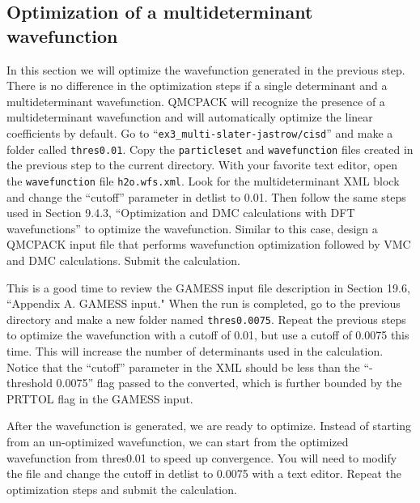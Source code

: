 \subsection{Optimization of a multideterminant wavefunction}

In this section we will optimize the wavefunction generated in the previous step. There
is no difference in the optimization steps if a single determinant and a multideterminant wavefunction.
QMCPACK will recognize the presence of a multideterminant wavefunction and will automatically 
optimize the linear coefficients by default. Go to ``\texttt{ex3\_multi-slater-jastrow/cisd}'' and make a folder called 
\texttt{thres0.01}. Copy the \texttt{particleset} and \texttt{wavefunction} files created in the previous step to the current 
directory. With your favorite text editor, open the \texttt{wavefunction} file \texttt{h2o.wfs.xml}. Look for 
the multideterminant XML block and change the ``cutoff'' parameter in detlist to 0.01. Then follow 
the same steps used in Section 9.4.3, ``Optimization and DMC calculations with DFT wavefunctions''
to optimize the wavefunction. Similar to this case, design a QMCPACK input file that performs
wavefunction optimization followed by VMC and DMC calculations. Submit the calculation.

This is a good time to review the GAMESS input file description in Section 19.6, ``Appendix A. GAMESS input."
When the run is completed, go to the previous directory and make a new folder named
\texttt{thres0.0075}. Repeat the previous steps to optimize the wavefunction with a cutoff of 0.01, but use a cutoff of 0.0075 this time. This will increase the number of determinants used in the calculation. Notice that the ``cutoff'' parameter in the XML should be less than the ``-threshold 0.0075'' flag passed to the converted, which is further bounded by the PRTTOL flag in the GAMESS input.

After the wavefunction is generated, we are ready to optimize. Instead of starting from an un-optimized wavefunction, we can start from the optimized wavefunction from thres0.01 to speed up convergence. You will need to modify the file and change the cutoff in detlist to 0.0075 with a text editor. Repeat the optimization steps and submit the calculation.

